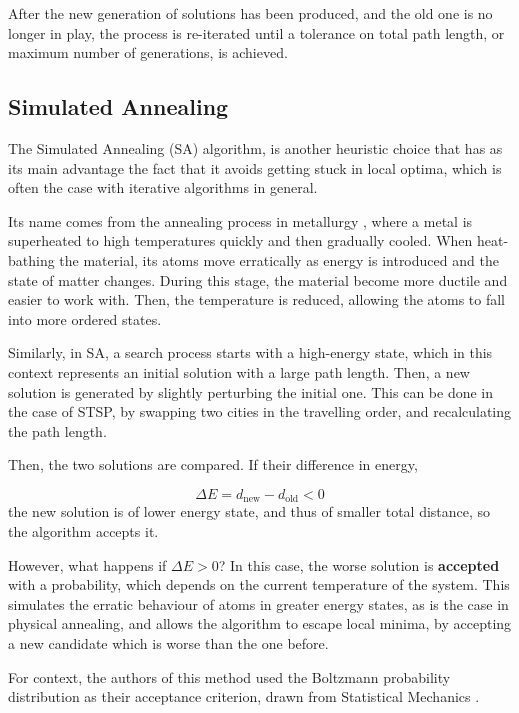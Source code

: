 After the new generation of solutions has been produced, and the old one is no longer in play, the process is re-iterated until a tolerance on total path length, or maximum number of generations, is achieved.

\subsection{Simulated Annealing}
\label{subsec: SA}

The Simulated Annealing (SA) algorithm, is another heuristic choice that has as its main advantage the fact that it avoids getting stuck in local optima, which is often the case with iterative algorithms in general.

Its name comes from the annealing process in metallurgy \cite{kirkpatrick1983optimization}, where a metal is superheated to high temperatures quickly and then gradually cooled. When heat-bathing the material, its atoms move erratically as energy is introduced and the state of matter changes. During this stage, the material become more ductile and easier to work with. Then, the temperature is reduced, allowing the atoms to fall into more ordered states.

Similarly, in SA, a search process starts with a high-energy state, which in this context represents an initial solution with a large path length. Then, a new solution is generated by slightly perturbing the initial one. This can be done in the case of STSP, by swapping two cities in the travelling order, and recalculating the path length.

Then, the two solutions are compared. If their difference in energy,

\[
	\Delta E = d_{\text{new}} - d_{\text{old}} < 0 
\]
the new solution is of lower energy state, and thus of smaller total distance, so the algorithm accepts it.

However, what happens if \( \Delta E > 0 \)? In this case, the worse solution is \textbf{accepted} with a probability, which depends on the current temperature of the system.  This simulates the erratic behaviour of atoms in greater energy states, as is the case in physical annealing, and allows the algorithm to escape local minima, by accepting a new candidate which is worse than the one before.

For context, the authors of this method used the Boltzmann probability distribution as their acceptance criterion, drawn from Statistical Mechanics \cite{kirkpatrick1983optimization}.

